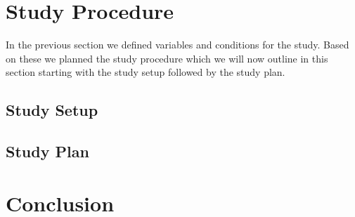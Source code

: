 \section{Study Procedure}
\label{section DPUS: Study Procedure}
In the previous section we defined variables and conditions for the study. Based on these we planned the study procedure which we will now outline in this section starting with the study setup followed by the study plan.

\subsection{Study Setup}
\label{subsection DPUS SP: Study Setup}

\subsection{Study Plan}
\label{subsection DPUS SP: Study Plan}

\section{Conclusion}
\label{section DPUS: Conclusion}



